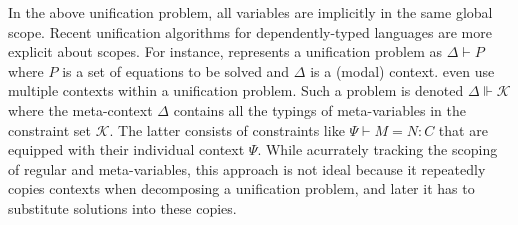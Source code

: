 In the above unification problem, all variables are implicitly in the same
global scope. Recent unification algorithms for dependently-typed languages
are more explicit about scopes. For instance, \citet{Reed2009} represents a unification
problem as $\Delta \vdash P$ where $P$ is a set of equations to be solved and $\Delta$ is
a (modal) context. \citet{Abel2011higher} even use multiple contexts within a unification problem.
Such a problem is denoted $\Delta \Vdash \mathcal{K}$ where the meta-context
$\Delta$ contains all the typings of meta-variables in the constraint set
$\mathcal{K}$. The latter consists of constraints like $\Psi \vdash M = N : C$
that are equipped with their individual context $\Psi$. While acurrately tracking
the scoping of regular and meta-variables, this approach is not ideal because it
repeatedly copies contexts when decomposing a unification problem, and
later it has to 
substitute solutions into these copies.

